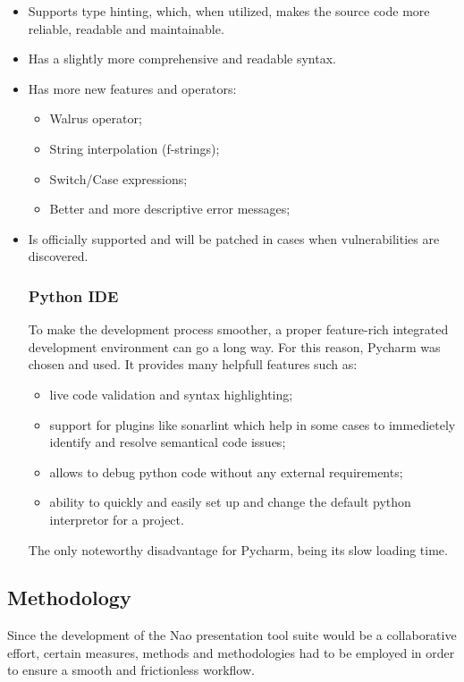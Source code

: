 \documentclass[12pt, fleqn, a4paper]{article}
\begin{document}
\begin{itemize}
	\item Supports type hinting, which, when utilized, makes the source code more reliable, readable and maintainable.
	\item Has a slightly more comprehensive and readable syntax.
	\item Has more new features and operators:
		\begin{itemize}
			\item Walrus operator;
			\item String interpolation (f-strings);
			\item Switch/Case expressions;
			\item Better and more descriptive error messages;
		\end{itemize}
	\item Is officially supported and will be patched in cases when vulnerabilities are discovered.
\subsubsection{Python IDE}
To make the development process smoother, a proper feature-rich integrated development environment can go a long way. For this reason, Pycharm was chosen and used. It provides many helpfull features such as:
\begin{itemize}
	\item live code validation and syntax highlighting;
	\item support for plugins like sonarlint which help in some cases to immedietely identify and resolve semantical code issues;
	\item allows to debug python code without any external requirements;
	\item ability to quickly and easily set up and change the default python interpretor for a project.
\end{itemize}
The only noteworthy disadvantage for Pycharm, being its slow loading time.
\end{itemize}
\subsection{Methodology}
Since the development of the Nao presentation tool suite would be a collaborative effort, certain measures, methods and methodologies had to be employed in order to ensure a smooth and frictionless workflow.
\end{document}
